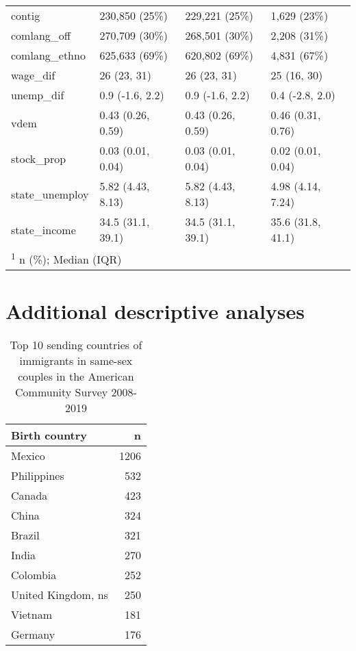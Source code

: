 \documentclass[
  11pt,
]{article}
\begin{document}
\begin{table}
\begin{tabular}[t]{llll}
contig & 230,850 (25\%) & 229,221 (25\%) & 1,629 (23\%)\\
\addlinespace
comlang\_off & 270,709 (30\%) & 268,501 (30\%) & 2,208 (31\%)\\
comlang\_ethno & 625,633 (69\%) & 620,802 (69\%) & 4,831 (67\%)\\
wage\_dif & 26 (23, 31) & 26 (23, 31) & 25 (16, 30)\\
unemp\_dif & 0.9 (-1.6, 2.2) & 0.9 (-1.6, 2.2) & 0.4 (-2.8, 2.0)\\
vdem & 0.43 (0.26, 0.59) & 0.43 (0.26, 0.59) & 0.46 (0.31, 0.76)\\
\addlinespace
stock\_prop & 0.03 (0.01, 0.04) & 0.03 (0.01, 0.04) & 0.02 (0.01, 0.04)\\
state\_unemploy & 5.82 (4.43, 8.13) & 5.82 (4.43, 8.13) & 4.98 (4.14, 7.24)\\
state\_income & 34.5 (31.1, 39.1) & 34.5 (31.1, 39.1) & 35.6 (31.8, 41.1)\\
\bottomrule
\multicolumn{4}{l}{\rule{0pt}{1em}\textsuperscript{1} n (\%); Median (IQR)}\\
\end{tabular}
\end{table}

\hypertarget{additional-descriptive-analyses}{%
\section{Additional descriptive analyses}\label{additional-descriptive-analyses}}

\begin{table}

\caption{\label{tab:desc-top1}Top 10 sending countries of immigrants in same-sex couples in the American Community Survey 2008-2019}
\centering
\begin{tabular}[t]{lr}
\toprule
Birth country & n\\
\midrule
Mexico & 1206\\
Philippines & 532\\
Canada & 423\\
China & 324\\
Brazil & 321\\
\addlinespace
India & 270\\
Colombia & 252\\
United Kingdom, ns & 250\\
Vietnam & 181\\
Germany & 176\\
\bottomrule
\end{tabular}
\end{table}
\end{document}
